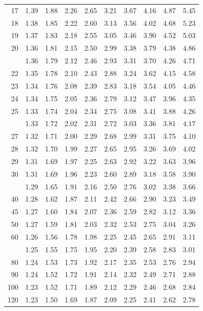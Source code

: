 \documentclass[10pt]{article}
\begin{document}
\begin{longtable}{@{}r!{\vrule width 0.8pt\hspace{0.55em}}rrrrrrrrr@{}}
17 & 1.39 & 1.88 & 2.26 & 2.65 & 3.21 & 3.67 & 4.16 & 4.87 & 5.45 \\
18 & 1.38 & 1.85 & 2.22 & 2.60 & 3.13 & 3.56 & 4.02 & 4.68 & 5.23 \\
19 & 1.37 & 1.83 & 2.18 & 2.55 & 3.05 & 3.46 & 3.90 & 4.52 & 5.03 \\
20 & 1.36 & 1.81 & 2.15 & 2.50 & 2.99 & 3.38 & 3.79 & 4.38 & 4.86 \\
 & 1.36 & 1.79 & 2.12 & 2.46 & 2.93 & 3.31 & 3.70 & 4.26 & 4.71 \\
22 & 1.35 & 1.78 & 2.10 & 2.43 & 2.88 & 3.24 & 3.62 & 4.15 & 4.58 \\
23 & 1.34 & 1.76 & 2.08 & 2.39 & 2.83 & 3.18 & 3.54 & 4.05 & 4.46 \\
24 & 1.34 & 1.75 & 2.05 & 2.36 & 2.79 & 3.12 & 3.47 & 3.96 & 4.35 \\
25 & 1.33 & 1.74 & 2.04 & 2.34 & 2.75 & 3.08 & 3.41 & 3.88 & 4.26 \\
 & 1.33 & 1.72 & 2.02 & 2.31 & 2.72 & 3.03 & 3.36 & 3.81 & 4.17 \\
27 & 1.32 & 1.71 & 2.00 & 2.29 & 2.68 & 2.99 & 3.31 & 3.75 & 4.10 \\
28 & 1.32 & 1.70 & 1.99 & 2.27 & 2.65 & 2.95 & 3.26 & 3.69 & 4.02 \\
29 & 1.31 & 1.69 & 1.97 & 2.25 & 2.63 & 2.92 & 3.22 & 3.63 & 3.96 \\
30 & 1.31 & 1.69 & 1.96 & 2.23 & 2.60 & 2.89 & 3.18 & 3.58 & 3.90 \\
 & 1.29 & 1.65 & 1.91 & 2.16 & 2.50 & 2.76 & 3.02 & 3.38 & 3.66 \\
40 & 1.28 & 1.62 & 1.87 & 2.11 & 2.42 & 2.66 & 2.90 & 3.23 & 3.49 \\
45 & 1.27 & 1.60 & 1.84 & 2.07 & 2.36 & 2.59 & 2.82 & 3.12 & 3.36 \\
50 & 1.27 & 1.59 & 1.81 & 2.03 & 2.32 & 2.53 & 2.75 & 3.04 & 3.26 \\
60 & 1.26 & 1.56 & 1.78 & 1.98 & 2.25 & 2.45 & 2.65 & 2.91 & 3.11 \\
 & 1.25 & 1.55 & 1.75 & 1.95 & 2.20 & 2.39 & 2.58 & 2.83 & 3.01 \\
80 & 1.24 & 1.53 & 1.73 & 1.92 & 2.17 & 2.35 & 2.53 & 2.76 & 2.94 \\
90 & 1.24 & 1.52 & 1.72 & 1.91 & 2.14 & 2.32 & 2.49 & 2.71 & 2.88 \\
100 & 1.23 & 1.52 & 1.71 & 1.89 & 2.12 & 2.29 & 2.46 & 2.68 & 2.84 \\
120 & 1.23 & 1.50 & 1.69 & 1.87 & 2.09 & 2.25 & 2.41 & 2.62 & 2.78 \\

\end{longtable}
\end{document}
